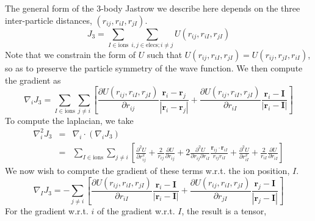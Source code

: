 \newcommand{\riI}{r_{iI}}
\newcommand{\briI}{\mathbf{r}_{iI}}
\newcommand{\rjI}{r_{jI}}
\newcommand{\brjI}{\mathbf{r}_{jI}}
\newcommand{\rij}{r_{ij}}
\newcommand{\brij}{\mathbf{r}_{ij}}
The general form of the 3-body Jastrow we describe here depends on the
three inter-particle distances, $(\rij, \riI, \rjI)$.
\begin{equation}
J_3 = \sum_{I\in\text{ions}} \sum_{i,j \in\text{elecs};i\neq j} U(\rij, \riI,
\rjI)
\end{equation}
Note that we constrain the form of $U$ such that
$U(\rij, \riI,\rjI) = U(\rij, \rjI,\riI)$, so as to preserve the
particle symmetry of the wave function.  We then compute the gradient as
\begin{equation}
\nabla_i J_3 =  \sum_{I\in\text{ions}} \sum_{j \neq i}
\left[\frac{\partial U(\rij, \riI,\rjI)}{\partial\rij}
  \frac{\mathbf{r}_i - \mathbf{r}_j}{|\mathbf{r}_i - \mathbf{r}_j|} 
+ \frac{\partial U(\rij, \riI,\rjI)}{\partial\riI}
  \frac{\mathbf{r}_i - \mathbf{I}}{|\mathbf{r}_i - \mathbf{I}|}  \right]
\end{equation}
To compute the laplacian, we take
\begin{eqnarray}
\nabla_i^2 J_3 & = & \nabla_i \cdot \left(\nabla_i J_3\right) \\
& = & \sum_{I\in\text{ions}} \sum_{j\neq i } \left[
\frac{\partial^2 U}{\partial \rij^2} + \frac{2}{\rij} \frac{\partial
  U}{\partial \rij} + 2 \frac{\partial^2 U}{\partial \rij \partial
  \riI}\frac{\brij\cdot\briI}{\rij\riI} +\frac{\partial^2 U}{\partial
  \riI^2}
+ \frac{2}{\riI}\frac{\partial U}{\partial \riI} \nonumber
\right]
\end{eqnarray}
We now wish to compute the gradient of these terms w.r.t. the ion position, $I$.
\begin{equation}
\nabla_I J_3 = -\sum_{j\neq i} \left[ \frac{\partial U(\rij, \riI,\rjI)}{\partial\riI}
  \frac{\mathbf{r}_i - \mathbf{I}}{|\mathbf{r}_i - \mathbf{I}|} 
+\frac{\partial U(\rij, \riI,\rjI)}{\partial\rjI}
  \frac{\mathbf{r}_j - \mathbf{I}}{|\mathbf{r}_j - \mathbf{I}|} \right]
\end{equation}
For the gradient w.r.t. $i$ of the gradient w.r.t. $I$, the result is a tensor,
